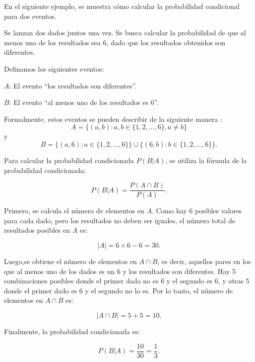 \documentclass[
  us-letterpaper,
]{scrreprt}
\theoremstyle{plain}
\theoremstyle{definition}
\theoremstyle{definition}
\theoremstyle{remark}
\begin{document}
En el siguiente ejemplo, se muestra cómo calcular la probabilidad
condicional para dos eventos.

\begin{tcolorbox}[enhanced jigsaw, colback=white, toptitle=1mm, arc=.35mm, rightrule=.15mm, left=2mm, colframe=quarto-callout-caution-color-frame, breakable, leftrule=.75mm, colbacktitle=quarto-callout-caution-color!10!white, coltitle=black, opacityback=0, bottomtitle=1mm, bottomrule=.15mm, titlerule=0mm, opacitybacktitle=0.6, toprule=.15mm, title={Ejemplo de lanzamiento simultáneo de dos dados}]

Se lanzan dos dados juntos una vez. Se busca calcular la probabilidad de
que al menos uno de los resultados sea 6, dado que los resultados
obtenidos son diferentes.

Definamos los siguientes eventos:

\(A\): El evento ``los resultados son diferentes''.

\(B\): El evento ``al menos uno de los resultados es 6''.

Formalmente, estos eventos se pueden describir de la siguiente manera :
\[
A = \{(a, b) : a, b \in \{1, 2, \dots, 6\}, a \neq b \}
\] y \[
B = \{(a, 6) : a \in \{1, 2, \dots, 6\}\} \cup \{(6, b) : b \in \{1, 2, \dots, 6\}\}.
\]

Para calcular la probabilidad condicionada \(P(B | A)\), se utiliza la
fórmula de la probabilidad condicionada:

\[
P(B | A) = \frac{P(A \cap B)}{P(A)}.
\]

Primero, se calcula el número de elementos en \(A\). Como hay 6 posibles
valores para cada dado, pero los resultados no deben ser iguales, el
número total de resultados posibles en \(A\) es:

\[
|A| = 6 \times 6 - 6 = 30.
\]

Luego,se obtiene el número de elementos en \(A \cap B\), es decir,
aquellos pares en los que al menos uno de los dados es un 6 y los
resultados son diferentes. Hay 5 combinaciones posibles donde el primer
dado no es 6 y el segundo es 6, y otras 5 donde el primer dado es 6 y el
segundo no lo es. Por lo tanto, el número de elementos en \(A \cap B\)
es:

\[
|A \cap B| = 5 + 5 = 10.
\]

Finalmente, la probabilidad condicionada es:

\[
P(B | A) = \frac{10}{30} = \frac{1}{3}.
\]

\end{tcolorbox}
\end{document}
